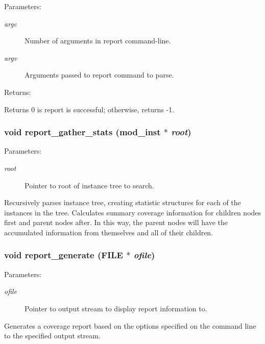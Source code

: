 \begin{Desc}
\item[Parameters: ]\par
\begin{description}
\item[{\em 
argc}]Number of arguments in report command-line. \item[{\em 
argv}]Arguments passed to report command to parse. \end{description}
\end{Desc}
\begin{Desc}
\item[Returns: ]\par
Returns 0 is report is successful; otherwise, returns -1. \end{Desc}
\subsubsection{\setlength{\rightskip}{0pt plus 5cm}void report\_\-gather\_\-stats ({\bf mod\_\-inst} $\ast$ {\em root})}\label{report_8c_a11}


\begin{Desc}
\item[Parameters: ]\par
\begin{description}
\item[{\em 
root}]Pointer to root of instance tree to search.\end{description}
\end{Desc}
Recursively parses instance tree, creating statistic structures for each of the instances in the tree. Calculates summary coverage information for children nodes first and parent nodes after. In this way, the parent nodes will have the accumulated information from themselves and all of their children. 
\subsubsection{\setlength{\rightskip}{0pt plus 5cm}void report\_\-generate (FILE $\ast$ {\em ofile})}\label{report_8c_a13}


\begin{Desc}
\item[Parameters: ]\par
\begin{description}
\item[{\em 
ofile}]Pointer to output stream to display report information to.\end{description}
\end{Desc}
Generates a coverage report based on the options specified on the command line to the specified output stream. 
